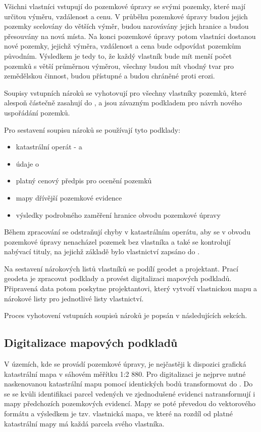 Všichni vlastníci vstupují do pozemkové úpravy se svými pozemky, které mají určitou výměru, vzdálenost a cenu. V průběhu pozemkové úpravy budou jejich pozemky scelovány do větších výměr, budou narovávány jejich hranice a budou přesouvány na nová místa. Na konci pozemkové úpravy potom vlastníci dostanou nové pozemky, jejichž výměra, vzdálenost a cena bude odpovídat pozemkům původním. Výsledkem je tedy to, že každý vlastník bude mít menší počet pozemků s větší průměrnou výměrou, všechny budou mít vhodný tvar pro zemědělskou činnost, budou přístupné a budou chráněné proti erozi.

Soupisy vstupních nároků se vyhotovují pro všechny vlastníky pozemků, které alespoň částečně zasahují do , a jsou závazným podkladem pro návrh nového uspořádání pozemků.

Pro sestavení soupisu nároků se používají tyto podklady:
	\begin{itemize}[leftmargin=1.5cm]
		\item katastrální operát -  a 
		\item údaje o 
		\item platný cenový předpis pro ocenění pozemků
		\item mapy dřívější pozemkové evidence
		\item výsledky podrobného zaměření hranice obvodu pozemkové úpravy
	\end{itemize}

Během zpracování  se odstraňují chyby v katastrálním operátu, aby se v obvodu pozemkové úpravy nenacházel pozemek bez vlastníka a také se kontrolují nabývací tituly, na jejichž základě bylo vlastnictví zapsáno do .

Na sestavení nárokových listů vlastníků se podílí geodet a projektant. Prací geodeta je zpracovat podklady a provést digitalizaci mapových podkladů. Připravená data potom poskytne projektantovi, který vytvoří vlastnickou mapu a nárokové listy pro jednotlivé listy vlastnictví.

Proces vyhotovení vstupních soupisů nároků je popsán v následujících sekcích.

\subsection{Digitalizace mapových podkladů}
\label{digitalizace}

V územích, kde se provádí pozemkové úpravy, je nejčastěji k dispozici grafická katastrální mapa v sáhovém měřítku 1:2 880. Pro digitalizaci je nejprve nutné naskenovanou katastrální mapu pomocí identických bodů transformovat do . Do  se se kvůli identifikaci parcel vedených ve zjednodušené evidenci natransformují i mapy předchozích pozemkových evidencí. Mapy se poté převedou do vektorového formátu a výsledkem je tzv. vlastnická mapa, ve které na rozdíl od platné katastrální mapy má každá parcela svého vlastníka.

